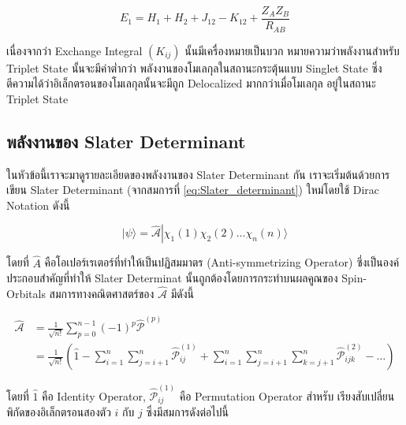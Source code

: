 \begin{equation}
    E_1
    =
    H_1 + H_2 + J_{12} - K_{12} + \frac{Z_A Z_B}{R_{A B}}
\end{equation}

เนื่องจากว่า Exchange Integral $(K_{i j})$ นั้นมีเครื่องหมายเป็นบวก หมายความว่าพลังงานสำหรับ Triplet State นั้นจะมีค่าต่ำกว่า%
พลังงานของโมเลกุลในสถานะกระตุ้นแบบ Singlet State ซึ่งตีความได้ว่าอิเล็กตรอนของโมเลกุลนั้นจะมีถูก Delocalized มากกว่าเมื่อโมเลกุล%
อยู่ในสถานะ Triplet State

\subsection{พลังงานของ Slater Determinant}

ในหัวข้อนี้เราจะมาดูรายละเอียดของพลังงานของ Slater Determinant กัน เราจะเริ่มต้นด้วยการเขียน Slater Determinant (จากสมการที่
\eqref{eq:Slater_determinant}) ใหม่โดยใช้ Dirac Notation ดังนี้

\begin{equation}
    \label{eq:Slater_determinant_simple}
    |\psi\rangle
    =
    \hat{\mathscr{A}} \left|\right. \chi_1(1) \chi_2(2) \ldots \chi_n(n)\bigr\rangle
\end{equation}

\noindent โดยที่ $\hat{A}$ คือโอเปอร์เรเตอร์ที่ทำให้เป็นปฏิสมมาตร (Anti-symmetrizing Operator) ซึ่งเป็นองค์ประกอบสำคัญที่ทำให้%
Slater Determinat นั้นถูกต้องโดยการกระทำบนผลคูณของ Spin-Orbitals สมการทางคณิตศาสตร์ของ $\hat{\mathscr{A}}$ มีดังนี้

\begin{equation}
    \label{eq:Antisymmetrizing_operator}
    \begin{aligned}
        \hat{\mathscr{A}}
         & = \frac{1}{\sqrt{n !}} \sum_{p=0}^{n-1}(-1)^p \hat{\mathscr{P}}^{(p)}                         \\
         & = \frac{1}{\sqrt{n !}}\left(\hat{1}-\sum_{i=1}^n \sum_{j=i+1}^n \hat{\mathscr{P}}_{i j}^{(1)}
        + \sum_{i=1}^n \sum_{j=i+1}^n \sum_{k=j+1}^n \hat{\mathscr{P}}_{i j k}^{(2)}-\ldots\right)
    \end{aligned}
\end{equation}

\noindent โดยที่ $\hat{1}$ คือ Identity Operator, $\hat{\mathscr{P}}_{i j}^{(1)}$ คือ Permutation Operator สำหรับ%
เรียงสับเปลี่ยนพิกัดของอิเล็กตรอนสองตัว $i$ กับ $j$ ซึ่งมีสมการดังต่อไปนี้

